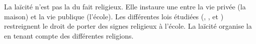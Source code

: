 \documentclass[12pt]{article}
\begin{document}
\begin{large}
\vspace{1cm}
La laïcité n'est pas la  du fait religieux. Elle instaure une  entre la vie privée (la maison) et la vie publique (l'école). Les différentes lois étudiées (, , et ) restreignent le droit de porter des signes religieux à l'école. La laïcité organise la  en tenant compte des différentes religions.

\end{large}
\end{document}
